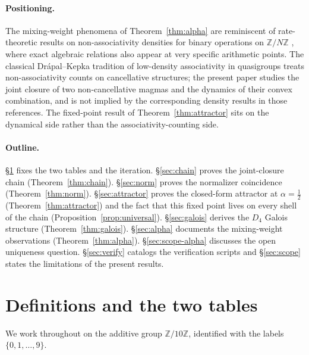 \documentclass[11pt,reqno]{amsart}
\theoremstyle{plain}
\theoremstyle{definition}
\theoremstyle{remark}
\newcommand{\Z}{\mathbb{Z}}
\newcommand{\Zten}{\Z/10\Z}
\begin{document}
\paragraph{Positioning.} The mixing-weight phenomena of
Theorem~\ref{thm:alpha} are reminiscent of rate-theoretic results
on non-associativity densities for binary operations on $\Z/N\Z$
\cite{SandersGish2026Sigma}, where exact algebraic relations also
appear at very specific arithmetic points. The classical
Drápal--Kepka tradition of low-density associativity in
quasigroups \cite{Kepka1980, DrapalKepka1985} treats
non-associativity counts on cancellative structures; the present
paper studies the joint closure of two non-cancellative magmas and
the dynamics of their convex combination, and is not implied by
the corresponding density results in those references. The
fixed-point result of Theorem~\ref{thm:attractor} sits on the
dynamical side rather than the associativity-counting side.

\paragraph{Outline.} \S\ref{sec:setup} fixes the two tables and
the iteration. \S\ref{sec:chain} proves the joint-closure chain
(Theorem~\ref{thm:chain}). \S\ref{sec:norm} proves the normalizer
coincidence (Theorem~\ref{thm:norm}). \S\ref{sec:attractor}
proves the closed-form attractor at $\alpha=\tfrac12$
(Theorem~\ref{thm:attractor}) and the fact that this fixed point
lives on every shell of the chain
(Proposition~\ref{prop:universal}). \S\ref{sec:galois}
derives the $D_{4}$ Galois structure (Theorem~\ref{thm:galois}).
\S\ref{sec:alpha} documents the mixing-weight observations
(Theorem~\ref{thm:alpha}). \S\ref{sec:scope-alpha} discusses the
open uniqueness question. \S\ref{sec:verify} catalogs the
verification scripts and \S\ref{sec:scope} states the limitations
of the present results.

\section{Definitions and the two tables}\label{sec:setup}

We work throughout on the additive group $\Zten$, identified with
the labels $\{0,1,\dots,9\}$.
\end{document}

